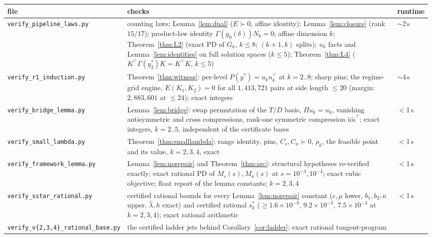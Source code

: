 \documentclass[11pt]{article}
\newcommand{\lam}{\lambda}
\begin{document}
\begin{center}
\small
\begin{tabular}{@{}>{\raggedright\arraybackslash}p{4.4cm}>{\raggedright\arraybackslash}p{7.8cm}l@{}}
\toprule
file & checks & runtime\\
\midrule
\texttt{verify\_pipeline\_laws.py} & counting laws; Lemma~\ref{lem:dual}
($E\succ0$, affine identity); Lemma~\ref{lem:closure} (rank $15/17$);
product-law identity $\Gamma(y_0(\delta))N_k=0$; affine dimension $k$;
Theorem~\ref{thm:L2} (exact PD of $G_k$, $k\le8$; $(k{+}1,k)$ splits);
$u_k$ facts and Lemma~\ref{lem:identities} on full solution spaces
($k\le5$); Theorem~\ref{thm:L4} ($K^\top\Gamma(y_2^\ast)K=K^\top K$,
$k\le5$) & $\sim$2\,s\\
\texttt{verify\_r1\_induction.py} & Theorem~\ref{thm:witness}: per-level
$P(y^\ast)=u_ku_k^\top$ at $k=2..8$; sharp pins; the regime-grid engine,
$E(K_1,K_2)=0$ for all $1{,}413{,}721$ pairs at side length $\le20$
(margin: $2{,}883{,}601$ at $\le24$); exact integers & $\sim$4\,s\\
\texttt{verify\_bridge\_lemma.py} & Lemma~\ref{lem:bridge}: swap
permutation of the $T/D$ basis, $\Pi u_k=u_k$, vanishing antisymmetric
and cross compressions, rank-one symmetric compression
$\tilde u\tilde u^\top$; exact integers, $k=2..5$, independent of the
certificate bases & $<$1\,s\\
\texttt{verify\_small\_lambda.py} & Theorem~\ref{thm:smalllambda}:
range identity, pins, $C_s,C_a\succ0$, $\rho_k$, the feasible point and
its value, $k=2,3,4$, exact & $<$1\,s\\
\texttt{verify\_framework\_}\newline\texttt{lemma.py} & Lemma~\ref{lem:norepair} and
Theorem~\ref{thm:arc}: structural hypotheses re-verified exactly; exact
rational PD of $M_s(s),M_a(s)$ at $s=10^{-3},10^{-4}$; exact cubic
objective; float report of the lemma constants; $k=2,3,4$ & $<$1\,s\\
\texttt{verify\_sstar\_}\newline\texttt{rational.py} & certified rational bounds
for every Lemma~\ref{lem:norepair} constant ($c,\mu$ lower, $b_1,b_2,
\kappa$ upper, $\hat\lam,h$ exact) and certified rational $s^\ast_k$
($\ge1.6\times10^{-3},\,9.2\times10^{-3},\,7.5\times10^{-3}$ at
$k=2,3,4$); exact rational arithmetic & $<$1\,s\\
\texttt{verify\_v\{2,3,4\}\_}\newline\texttt{rational\_base.py} & the certified ladder
jets behind Corollary~\ref{cor:ladder}: exact rational tangent-program

\end{tabular}
\end{center}
\end{document}

